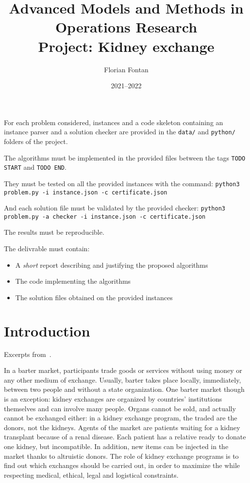 \documentclass[a4paper,twocolumn]{article}
\author{Florian Fontan}
\title{Advanced Models and Methods in Operations Research \\ Project: Kidney exchange}
\date{2021--2022}
\begin{document}
\maketitle

For each problem considered, instances and a code skeleton containing an instance parser and a solution checker are provided in the \texttt{data/} and \texttt{python/} folders of the project.

The algorithms must be implemented in the provided files between the tags \texttt{TODO START} and \texttt{TODO END}.

They must be tested on all the provided instances with the command:
\texttt{python3 problem.py -i instance.json -c certificate.json}

And each solution file must be validated by the provided checker:
\texttt{python3 problem.py -a checker -i instance.json -c certificate.json}

The results must be reproducible.

\bigskip

The delivrable must contain:
\begin{itemize}
  \item A \emph{short} report describing and justifying the proposed algorithms
  \item The code implementing the algorithms
  \item The solution files obtained on the provided instances
\end{itemize}

\section*{Introduction}

Excerpts from~\cite{pansart_algorithms_2020}.

In a barter market, participants trade goods or services without using money or any other medium of exchange. Usually, barter takes place locally, immediately, between two people and without a state organization. One barter market though is an exception: kidney exchanges are organized by countries’ institutions themselves and can involve many people. Organs
cannot be sold, and actually cannot be exchanged either: in a kidney exchange program, the traded  are the donors, not the kidneys. Agents of the market are patients waiting for a kidney transplant because of a renal disease. Each patient has a relative ready to donate one kidney, but incompatible. In addition, new items can be injected in the market thanks
to altruistic donors. The role of kidney exchange programs is to find out which exchanges should be carried out, in order to maximize the  while respecting medical, ethical, legal and logistical constraints.
\end{document}
